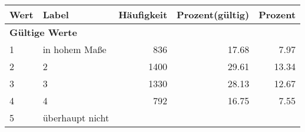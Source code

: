      \begin{longtable}{lXrrr}
     \toprule
     \textbf{Wert} & \textbf{Label} & \textbf{Häufigkeit} & \textbf{Prozent(gültig)} & \textbf{Prozent} \\
     \endhead
     \midrule
     \multicolumn{5}{l}{\textbf{Gültige Werte}}\\

     1 &
     \multicolumn{1}{X}{ in hohem Maße   } &


       \num{836} &
       \num[round-mode=places,round-precision=2]{17.68} &
         \num[round-mode=places,round-precision=2]{7.97} \\

     2 &
     \multicolumn{1}{X}{ 2   } &


       \num{1400} &
       \num[round-mode=places,round-precision=2]{29.61} &
         \num[round-mode=places,round-precision=2]{13.34} \\

     3 &
     \multicolumn{1}{X}{ 3   } &


       \num{1330} &
       \num[round-mode=places,round-precision=2]{28.13} &
         \num[round-mode=places,round-precision=2]{12.67} \\

     4 &
     \multicolumn{1}{X}{ 4   } &


       \num{792} &
       \num[round-mode=places,round-precision=2]{16.75} &
         \num[round-mode=places,round-precision=2]{7.55} \\

     5 &
     \multicolumn{1}{X}{ überhaupt nicht   } &



\end{longtable}
